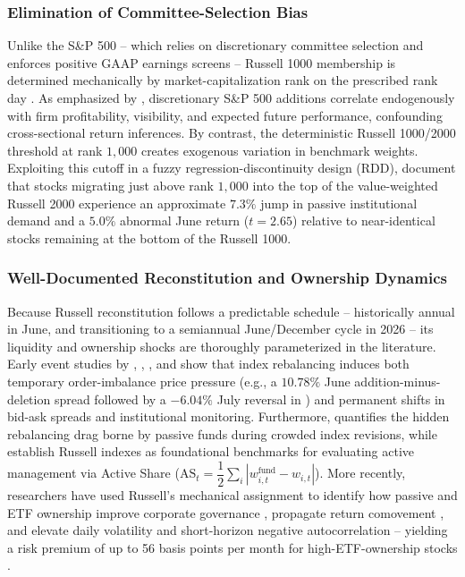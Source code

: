 \subsubsection*{Elimination of Committee-Selection Bias}
Unlike the S\&P 500 -- which relies on discretionary committee selection and enforces positive GAAP earnings screens -- Russell 1000 membership is determined mechanically by market-capitalization rank on the prescribed rank day \cite{chang2015, bendavid2019}. As emphasized by \cite{chang2015}, discretionary S\&P 500 additions correlate endogenously with firm profitability, visibility, and expected future performance, confounding cross-sectional return inferences. By contrast, the deterministic Russell 1000/2000 threshold at rank $1{,}000$ creates exogenous variation in benchmark weights. Exploiting this cutoff in a fuzzy regression-discontinuity design (RDD), \cite{chang2015} document that stocks migrating just above rank $1{,}000$ into the top of the value-weighted Russell 2000 experience an approximate $7.3\%$ jump in passive institutional demand and a $5.0\%$ abnormal June return ($t = 2.65$) relative to near-identical stocks remaining at the bottom of the Russell 1000.

\subsubsection*{Well-Documented Reconstitution and Ownership Dynamics}
Because Russell reconstitution follows a predictable schedule -- historically annual in June, and transitioning to a semiannual June/December cycle in 2026 \cite{ftserussell2026} -- its liquidity and ownership shocks are thoroughly parameterized in the literature. Early event studies by \cite{madhavan2003}, \cite{biktimirov2004}, \cite{chen2006}, and \cite{cai2008} show that index rebalancing induces both temporary order-imbalance price pressure (e.g., a $10.78\%$ June addition-minus-deletion spread followed by a $-6.04\%$ July reversal in \cite{madhavan2003}) and permanent shifts in bid-ask spreads and institutional monitoring. Furthermore, \cite{petajisto2011} quantifies the hidden rebalancing drag borne by passive funds during crowded index revisions, while \cite{cremers2009} establish Russell indexes as foundational benchmarks for evaluating active management via Active Share ($\mathrm{AS}_t = \dfrac{1}{2}\displaystyle\sum_i |w_{i,t}^{\mathrm{fund}} - w_{i,t}|$). More recently, researchers have used Russell's mechanical assignment to identify how passive and ETF ownership improve corporate governance \cite{appel2016}, propagate return comovement \cite{chen2016, da2018}, and elevate daily volatility and short-horizon negative autocorrelation -- yielding a risk premium of up to 56 basis points per month for high-ETF-ownership stocks \cite{bendavid2018}.

